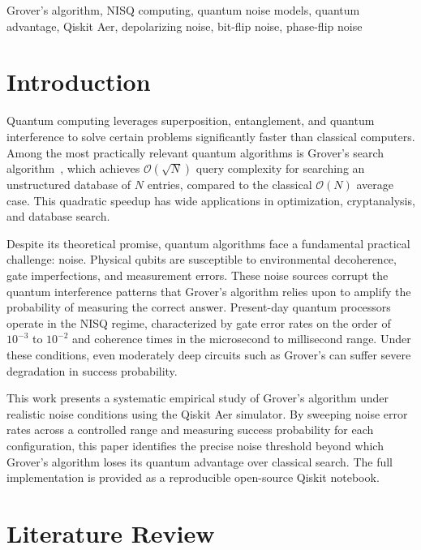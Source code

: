 \documentclass[conference]{IEEEtran}
\begin{document}
\begin{IEEEkeywords}
Grover's algorithm, NISQ computing, quantum noise models, quantum advantage,
Qiskit Aer, depolarizing noise, bit-flip noise, phase-flip noise
\end{IEEEkeywords}

\section{Introduction}

Quantum computing leverages superposition, entanglement, and quantum interference
to solve certain problems significantly faster than classical computers. Among the
most practically relevant quantum algorithms is Grover's search algorithm~\cite{grover1996},
which achieves $\mathcal{O}(\sqrt{N})$ query complexity for searching an unstructured
database of $N$ entries, compared to the classical $\mathcal{O}(N)$ average case.
This quadratic speedup has wide applications in optimization, cryptanalysis, and
database search.

Despite its theoretical promise, quantum algorithms face a fundamental practical
challenge: noise. Physical qubits are susceptible to environmental decoherence,
gate imperfections, and measurement errors. These noise sources corrupt the quantum
interference patterns that Grover's algorithm relies upon to amplify the probability
of measuring the correct answer. Present-day quantum processors operate in the NISQ
regime, characterized by gate error rates on the order of $10^{-3}$ to $10^{-2}$
and coherence times in the microsecond to millisecond range. Under these conditions,
even moderately deep circuits such as Grover's can suffer severe degradation in
success probability.

This work presents a systematic empirical study of Grover's algorithm under
realistic noise conditions using the Qiskit Aer simulator. By sweeping noise error
rates across a controlled range and measuring success probability for each
configuration, this paper identifies the precise noise threshold beyond which
Grover's algorithm loses its quantum advantage over classical search. The full
implementation is provided as a reproducible open-source Qiskit notebook.

\section{Literature Review}
\end{document}
